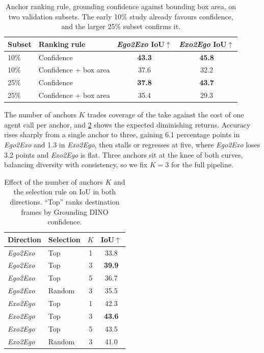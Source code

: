 \begin{table}
  \centering\small
  \setlength{\tabcolsep}{6pt}
  \caption{Anchor ranking rule, grounding confidence against bounding box area, on two validation subsets. The early 10\% study already favours confidence, and the larger 25\% subset confirms it.}
  \label{tab:abl-anchor-rule}
  \begin{tabular}{llcc}
  \toprule
  Subset & Ranking rule & \textit{Ego2Exo} IoU$\uparrow$ & \textit{Exo2Ego} IoU$\uparrow$ \\
  \midrule
  10\% & Confidence            & \textbf{43.3} & \textbf{45.8} \\
  10\% & Confidence + box area & 37.6 & 32.2 \\
  \midrule
  25\% & Confidence            & \textbf{37.8} & \textbf{43.7} \\
  25\% & Confidence + box area & 35.4 & 29.3 \\
  \bottomrule
  \end{tabular}
\end{table}

The number of anchors $K$ trades coverage of the take against the cost of one agent call per anchor, and \cref{tab:abl-anchors} shows the expected diminishing returns. Accuracy rises sharply from a single anchor to three, gaining 6.1 percentage points in \textit{Ego2Exo} and 1.3 in \textit{Exo2Ego}, then stalls or regresses at five, where \textit{Ego2Exo} loses 3.2 points and \textit{Exo2Ego} is flat. Three anchors sit at the knee of both curves, balancing diversity with consistency, so we fix $K=3$ for the full pipeline.

\begin{table}[h]
  \centering
  \setlength{\tabcolsep}{6pt}
  \caption{Effect of the number of anchors $K$ and the selection rule on IoU in both directions. ``Top'' ranks destination frames by Grounding DINO confidence.}
  \label{tab:abl-anchors}
  \begin{tabular}{llcc}
  \toprule
  Direction & Selection & $K$ & IoU$\uparrow$ \\
  \midrule
  \textit{Ego2Exo} & Top    & 1 & 33.8 \\
  \textit{Ego2Exo} & Top    & 3 & \textbf{39.9} \\
  \textit{Ego2Exo} & Top    & 5 & 36.7 \\
  \textit{Ego2Exo} & Random & 3 & 35.5 \\
  \midrule
  \textit{Exo2Ego} & Top    & 1 & 42.3 \\
  \textit{Exo2Ego} & Top    & 3 & \textbf{43.6} \\
  \textit{Exo2Ego} & Top    & 5 & 43.5 \\
  \textit{Exo2Ego} & Random & 3 & 41.0 \\
  \bottomrule
  \end{tabular}
\end{table}

